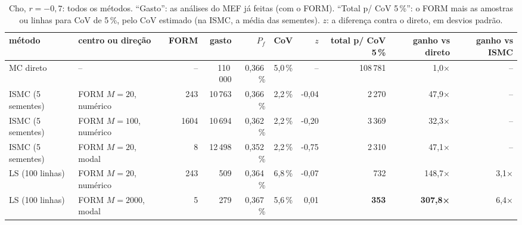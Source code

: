 \begin{landscape}
\begin{table}[H]\centering\small
\caption{Cho, $r = -0{,}7$: todos os métodos. ``Gasto'': as análises do MEF já feitas (com o FORM). ``Total p/ CoV 5\,\%'': o FORM mais as amostras ou linhas para CoV de 5\,\%, pelo CoV estimado (na ISMC, a média das sementes). $z$: a diferença contra o direto, em desvios padrão.}\label{tab:r07}
\begin{tabular}{llrrrrrrrr}\toprule
método & centro ou direção & FORM & gasto & $P_f$ & CoV & $z$ & total p/ CoV 5\,\% & ganho vs direto & ganho vs ISMC \\\midrule
MC direto & -- & -- & 110\,000 & 0,366\,\% & 5,0\,\% & -- & 108\,781 & 1,0× & -- \\
ISMC (5 sementes) & FORM $M = 20$, numérico & 243 & 10\,763 & 0,366\,\% & 2,2\,\% & -0,04 & 2\,270 & 47,9× & -- \\
ISMC (5 sementes) & FORM $M = 100$, numérico & 1604 & 10\,694 & 0,362\,\% & 2,2\,\% & -0,20 & 3\,369 & 32,3× & -- \\
ISMC (5 sementes) & FORM $M = 20$, modal & 8 & 12\,498 & 0,352\,\% & 2,2\,\% & -0,75 & 2\,310 & 47,1× & -- \\
LS (100 linhas) & FORM $M = 20$, numérico & 243 & 509 & 0,364\,\% & 6,8\,\% & -0,07 & 732 & 148,7× & 3,1× \\
LS (100 linhas) & FORM $M = 2000$, modal & 5 & 279 & 0,367\,\% & 5,6\,\% & 0,01 & \textbf{353} & \textbf{307,8×} & 6,4× \\
\bottomrule\end{tabular}\end{table}

\end{landscape}

